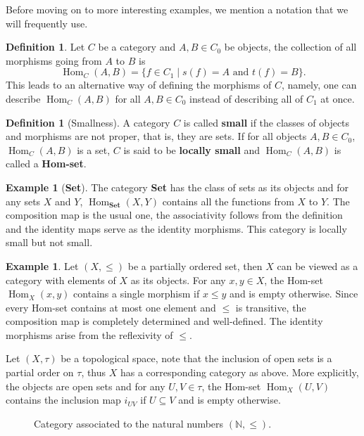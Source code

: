 \documentclass{article}
\theoremstyle{definition}
\newtheorem{defn}[thm]{Definition}
\newtheorem{exmp}[thm]{Example}
\theoremstyle{remark}
\newcommand{\N}{\mathbb{N}}
\DeclareMathOperator{\Hom}{Hom}
\begin{document}
Before moving on to more interesting examples, we mention a notation that we will frequently use.
\begin{defn}
	Let $C$ be a category and $A,B \in C_0$ be objects, the collection of all morphisms going from $A$ to $B$ is 
	\[\Hom_{C}(A,B) = \{f \in C_1 \mid s(f) = A \text{ and } t(f) = B\}.\]
	This leads to an alternative way of defining the morphisms of $C$, namely, one can describe $\Hom_C(A,B)$ for all $A, B \in C_0$ instead of describing all of $C_1$ at once. 
\end{defn}
\begin{defn}[Smallness]
	A category $C$ is called \textbf{small} if the classes of objects and morphisms are not proper, that is, they are sets. If for all objects $A,B \in C_0$, $\Hom_C(A,B)$ is a set, $C$ is said to be \textbf{locally small} and $\Hom_C(A,B)$ is called a \textbf{Hom-set}.
\end{defn}
\begin{exmp}[\textbf{\textbf{Set}}]
	The category \textbf{Set} has the class of sets as its objects and for any sets $X$ and $Y$, $\Hom_{\textbf{Set}}(X,Y)$ contains all the functions from $X$ to $Y$. The composition map is the usual one, the associativity follows from the definition and the identity maps serve as the identity morphisms. This category is locally small but not small.
\end{exmp}
\begin{exmp}
	Let $(X, \leq)$ be a partially ordered set, then $X$ can be viewed as a category with elements of $X$ as its objects. For any $x,y \in X$, the Hom-set $\Hom_X(x,y)$ contains a single morphism if $x \leq y$ and is empty otherwise. Since every Hom-set contains at most one element and $\leq$ is transitive, the composition map is completely determined and well-defined. The identity morphisms arise from the reflexivity of $\leq$.
	
	Let $(X, \tau)$ be a topological space, note that the inclusion of open sets is a partial order on $\tau$, thus $X$ has a corresponding category as above. More explicitly, the objects are open sets and for any $U, V \in \tau$, the Hom-set $\Hom_X(U,V)$ contains the inclusion map $i_{UV}$ if $U\subseteq V$ and is empty otherwise.
	\begin{figure}[h]
		\centering
		\caption*{Category associated to the natural numbers $(\N, \leq)$.}
	\end{figure}
\end{exmp}
\end{document}
